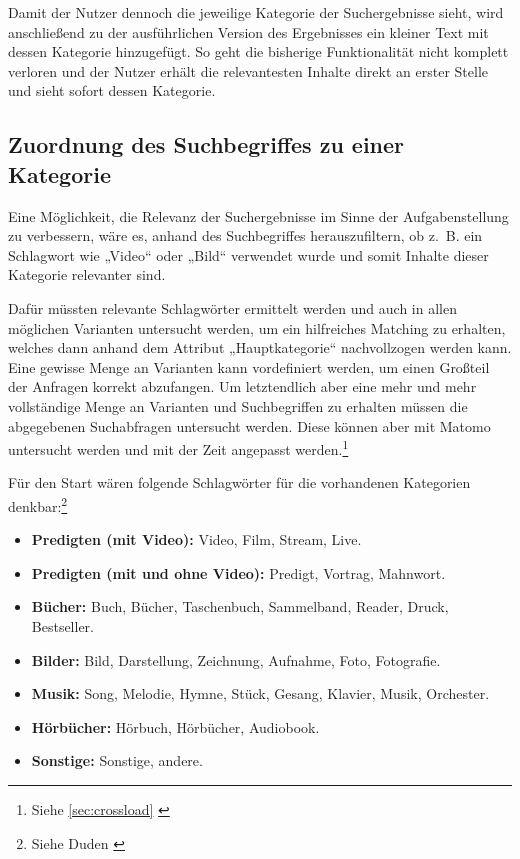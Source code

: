 Damit der Nutzer dennoch die jeweilige Kategorie der Suchergebnisse sieht, wird anschließend zu der ausführlichen Version des Ergebnisses ein kleiner Text mit dessen Kategorie hinzugefügt.
So geht die bisherige Funktionalität nicht komplett verloren und der Nutzer erhält die relevantesten Inhalte direkt an erster Stelle und sieht sofort dessen Kategorie.

\subsection{Zuordnung des Suchbegriffes zu einer Kategorie}
\label{sub:keyword}
Eine Möglichkeit, die Relevanz der Suchergebnisse im Sinne der Aufgabenstellung zu verbessern, wäre es, anhand des Suchbegriffes herauszufiltern, ob z. B. ein Schlagwort wie „Video“ oder „Bild“ verwendet wurde und somit Inhalte dieser Kategorie relevanter sind.

Dafür müssten relevante Schlagwörter ermittelt werden und auch in allen möglichen Varianten untersucht werden, um ein hilfreiches Matching zu erhalten, welches dann anhand dem Attribut „Hauptkategorie“ nachvollzogen werden kann.
Eine gewisse Menge an Varianten kann vordefiniert werden, um einen Großteil der Anfragen korrekt abzufangen.
Um letztendlich aber eine mehr und mehr vollständige Menge an Varianten und Suchbegriffen zu erhalten müssen die abgegebenen Suchabfragen untersucht werden.
Diese können aber mit Matomo untersucht werden und mit der Zeit angepasst werden.\footnote{Siehe \ref{sec:crossload} \cite{matomo2022}}

Für den Start wären folgende Schlagwörter für die vorhandenen Kategorien denkbar:\footnote{Siehe Duden \cite{dudensynonyme2022}}
\begin{itemize}
  \item \textbf{Predigten (mit Video):} Video, Film, Stream, Live.
  \item \textbf{Predigten (mit und ohne Video):} Predigt, Vortrag, Mahnwort.
  \item \textbf{Bücher:} Buch, Bücher, Taschenbuch, Sammelband, Reader, Druck, Bestseller.
  \item \textbf{Bilder:} Bild, Darstellung, Zeichnung, Aufnahme, Foto, Fotografie.
  \item \textbf{Musik:} Song, Melodie, Hymne, Stück, Gesang, Klavier, Musik, Orchester.
  \item \textbf{Hörbücher:} Hörbuch, Hörbücher, Audiobook.
  \item \textbf{Sonstige:} Sonstige, andere.
\end{itemize}

